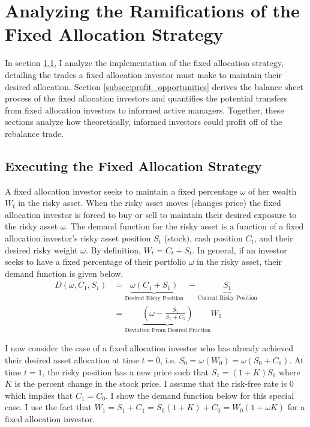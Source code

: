 \documentclass[12pt]{article}
\begin{document}
\section{Analyzing the Ramifications of the Fixed Allocation Strategy} \label{sec:ramifications}
In section \ref{subsec:execution}, I analyze the implementation of the fixed allocation strategy, detailing the trades a fixed allocation investor must make to maintain their desired allocation. Section \ref{subsec:profit_opportunities} derives the balance sheet process of the fixed allocation investors and quantifies the potential transfers from fixed allocation investors to informed active managers. Together, these sections analyze how theoretically, informed investors could profit off of the rebalance trade.


\subsection{Executing the Fixed Allocation Strategy} \label{subsec:execution}
A fixed allocation investor seeks to maintain a fixed percentage $\omega$ of her wealth $W_{t}$ in the risky asset. When the risky asset moves (changes price) the fixed allocation investor is forced to buy or sell to maintain their desired exposure to the risky asset $\omega$. The demand function for the risky asset is a function of a fixed allocation investor's risky asset position $S_t$ (stock), cash position $C_t$, and their desired risky weight $\omega$. By definition, $W_t = C_t+S_t$. In general, if an investor seeks to have a fixed percentage of their portfolio $\omega$ in the risky asset, their demand function is given below. 
\begin{align}
D(\omega, C_1,S_1) &= \underbrace{\omega(C_1+S_1)}_{\text{Desired Risky Position}} \ \ - \underbrace{S_1}_{\text{Current Risky Position}} \nonumber  \\
&= \underbrace{\left(\omega-\frac{S_1}{S_1 + C_1}\right)}_{\text{Deviation From Desired Fraction}}W_1
\end{align}
\par I now consider the case of a fixed allocation investor who has already achieved their desired asset allocation at time $t=0$, i.e. $S_0 = \omega(W_0) = \omega(S_0 + C_0)$. At time $t=1$, the risky position has a new price such that $S_1 = (1+K)S_0$ where $K$ is the percent change in the stock price. I assume that the risk-free rate is $0$ which implies that $C_1=C_0$. I show the demand function below for this special case. I use the fact that $W_1 = S_1 + C_1 = S_0(1+K) + C_0 = W_0(1+\omega K)$ for a fixed allocation investor.
\end{document}
